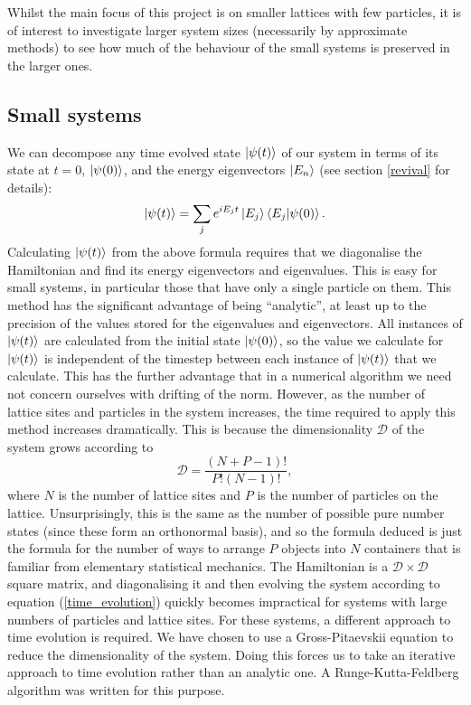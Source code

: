 \documentclass[a4paper,10pt]{article}
\theoremstyle{plain}
\begin{document}
Whilst the main focus of this project is on smaller lattices with few particles, it is of interest to investigate larger system sizes (necessarily by approximate methods) to see how much
of the behaviour of the small systems is preserved in the larger ones.

\subsection{Small systems}

We can decompose any time evolved state $\ket{\psi(t)}$ of our system in terms of its state at $t=0$, $\ket{\psi(0)}$, and the energy eigenvectors $\ket{E_n}$ (see section \ref{revival}
for details):
\begin{equation}
  \ket{\psi(t)}=\sum_je^{iE_{j}t}\ket{E_j}\braket{E_j|\psi(0)}.
\end{equation}
Calculating $\ket{\psi(t)}$ from the above formula requires that we diagonalise
the Hamiltonian and find its energy eigenvectors and eigenvalues. This is easy
for small systems, in particular those that have only a single particle on them.
This method has the significant advantage of being ``analytic'', at least up to
the precision of the values stored for the eigenvalues and eigenvectors. All
instances of $\ket{\psi(t)}$ are calculated from the initial state
$\ket{\psi(0)}$, so the value we calculate for $\ket{\psi(t)}$ is independent of the timestep
between each instance of $\ket{\psi(t)}$ that we calculate. This has the further
advantage that in a numerical algorithm we need not concern ourselves with
drifting of the norm. However, as the number of lattice
sites and particles in the system increases, the time required to apply this
method increases dramatically. This is because the dimensionality $\mathcal{D}$
of the system grows according to
\begin{equation}
 \mathcal{D}=\frac{\left(N+P-1\right)!}{P!\left(N-1\right)!}, \label{time_evolution}
\end{equation}
where $N$ is the number of lattice sites and $P$ is the number of particles on the lattice. Unsurprisingly, this is the same as the number of possible pure number states (since these form
an orthonormal basis), and so the formula deduced is just the formula for the number of ways to arrange $P$ objects into $N$ containers that is familiar from elementary statistical mechanics.
The Hamiltonian is a $\mathcal{D}\times\mathcal{D}$ square matrix, and diagonalising it and then evolving the system according to equation (\ref{time_evolution}) quickly becomes impractical
for systems with large numbers of particles and lattice sites. For these systems, a different approach to time evolution is required. We have chosen to use a Gross-Pitaevskii equation to reduce
the dimensionality of the system. Doing this forces us to take an iterative approach to time evolution rather than an analytic one. A Runge-Kutta-Feldberg algorithm \cite{Burden2005} was written for this purpose.
\end{document}
